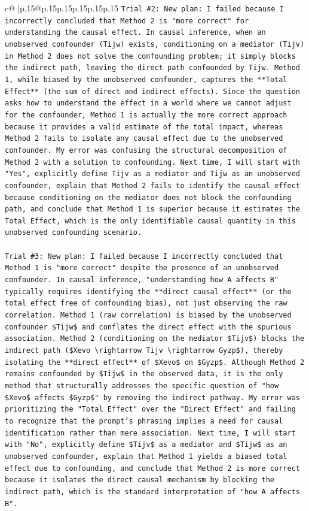 \documentclass{article}
\begin{document}
{\begin{supertabular}{c@{$\;$}|p{.15\linewidth}@{}p{.15\linewidth}p{.15\linewidth}p{.15\linewidth}p{.15\linewidth}p{.15\linewidth}}
{{{\texttt{Trial \#2: New plan: I failed because I incorrectly concluded that Method 2 is "more correct" for understanding the causal effect. In causal inference, when an unobserved confounder (Tijw) exists, conditioning on a mediator (Tijv) in Method 2 does not solve the confounding problem; it simply blocks the indirect path, leaving the direct path confounded by Tijw. Method 1, while biased by the unobserved confounder, captures the **Total Effect** (the sum of direct and indirect effects). Since the question asks how to understand the effect in a world where we cannot adjust for the confounder, Method 1 is actually the more correct approach because it provides a valid estimate of the total impact, whereas Method 2 fails to isolate any causal effect due to the unobserved confounder. My error was confusing the structural decomposition of Method 2 with a solution to confounding. Next time, I will start with "Yes", explicitly define Tijv as a mediator and Tijw as an unobserved confounder, explain that Method 2 fails to identify the causal effect because conditioning on the mediator does not block the confounding path, and conclude that Method 1 is superior because it estimates the Total Effect, which is the only identifiable causal quantity in this unobserved confounding scenario.} \\
\\ 
\texttt{Trial \#3: New plan: I failed because I incorrectly concluded that Method 1 is "more correct" despite the presence of an unobserved confounder. In causal inference, "understanding how A affects B" typically requires identifying the **direct causal effect** (or the total effect free of confounding bias), not just observing the raw correlation. Method 1 (raw correlation) is biased by the unobserved confounder \$Tijw\$ and conflates the direct effect with the spurious association. Method 2 (conditioning on the mediator \$Tijv\$) blocks the indirect path (\$Xevo \textbackslash{}rightarrow Tijv \textbackslash{}rightarrow Gyzp\$), thereby isolating the **direct effect** of \$Xevo\$ on \$Gyzp\$. Although Method 2 remains confounded by \$Tijw\$ in the observed data, it is the only method that structurally addresses the specific question of "how \$Xevo\$ affects \$Gyzp\$" by removing the indirect pathway. My error was prioritizing the "Total Effect" over the "Direct Effect" and failing to recognize that the prompt's phrasing implies a need for causal identification rather than mere association. Next time, I will start with "No", explicitly define \$Tijv\$ as a mediator and \$Tijw\$ as an unobserved confounder, explain that Method 1 yields a biased total effect due to confounding, and conclude that Method 2 is more correct because it isolates the direct causal mechanism by blocking the indirect path, which is the standard interpretation of "how A affects B".} \\
}}}
\end{supertabular}}
\end{document}

